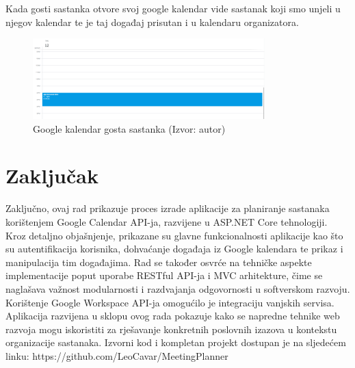 \documentclass{foi}
\begin{document}
Kada gosti sastanka otvore svoj google kalendar vide sastanak koji smo unjeli u njegov kalendar te je taj događaj prisutan i u kalendaru organizatora.
\begin{figure}[H]
    \centering
    \includegraphics[width=0.8\textwidth]{slike/appUsage7.png}
    \caption{Google kalendar gosta sastanka (Izvor: autor)}
    \label{fig:GCUserUI}
\end{figure}

\chapter{Zaključak}
Zaključno, ovaj rad prikazuje proces izrade aplikacije za planiranje sastanaka korištenjem Google Calendar API-ja, razvijene u ASP.NET Core tehnologiji. Kroz detaljno objašnjenje, prikazane su glavne funkcionalnosti aplikacije kao što su autentifikacija korisnika, dohvaćanje događaja iz Google kalendara te prikaz i manipulacija tim događajima. Rad se također osvrće na tehničke aspekte implementacije poput uporabe RESTful API-ja i MVC arhitekture, čime se naglašava važnost modularnosti i razdvajanja odgovornosti u softverskom razvoju. Korištenje Google Workspace API-ja omogućilo je integraciju vanjskih servisa. Aplikacija razvijena u sklopu ovog rada pokazuje kako se napredne tehnike web razvoja mogu iskoristiti za rješavanje konkretnih poslovnih izazova u kontekstu organizacije sastanaka.
Izvorni kod i kompletan projekt dostupan je na sljedećem linku: https://github.com/LeoCavar/MeetingPlanner
\printbibliography[title=Popis literature]

\listoffigures
{}
\end{document}

